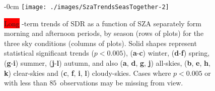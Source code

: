 \documentclass[applsci,article,accept,moreauthors,pdftex]{Definitions/mdpi}
\begin{document}
\vspace{-6pt}


\begin{figure}[H]
    \begin{adjustwidth}{-\extralength}{0cm}
        {\centering
            \texttt{[image: ./images/SzaTrendsSeasTogether-2]}
        }
   \end{adjustwidth}
        \caption{\colorbox{red}{Long}%
 -term trends of SDR as a function of SZA separately form morning
               and afternoon periods, by season (rows of plots) for the three sky
               conditions (columns of plots).
               Solid shapes represent statistical significant trends ($p<0.005$), (\textbf{a}-\textbf{c}) winter, (\textbf{d}-\textbf{f}) spring, (\textbf{g}-\textbf{i}) summer, (\textbf{j}-\textbf{l}) autumn, and also (\textbf{a}, \textbf{d}, \textbf{g}, \textbf{j}) all-skies, (\textbf{b}, \textbf{e}, \textbf{h}, \textbf{k}) clear-skies and (\textbf{c}, \textbf{f}, \textbf{i}, \textbf{l}) cloudy-skies.
               Cases where $p<0.005$ or with less than $85$~observations may be
               missing from view.}\label{fig:SZAtrendSeason}
 
\end{figure}




\FloatBarrier

%
\end{document}
